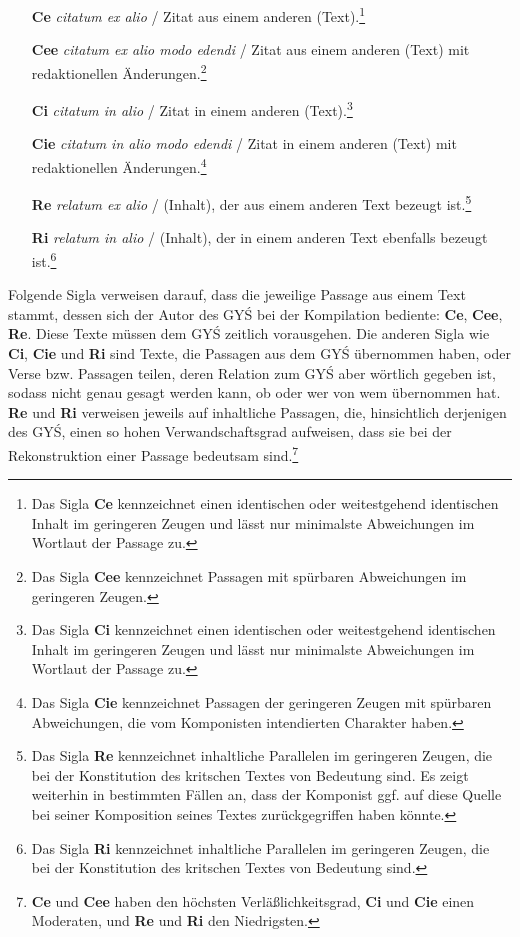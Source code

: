 \documentclass[a4paper,12pt]{article}
\begin{document}
\begin{enumerate}
\item[\textbf{Ce}] \textit{citatum ex alio} / Zitat aus einem anderen (Text).\footnote{Das Sigla \textbf{Ce} kennzeichnet einen identischen oder weitestgehend identischen Inhalt im geringeren Zeugen und lässt nur minimalste Abweichungen im Wortlaut der Passage zu.}
\item[\textbf{Cee}] \textit{citatum ex alio modo edendi} / Zitat aus einem anderen (Text) mit redaktionellen Änderungen.\footnote{Das Sigla \textbf{Cee} kennzeichnet Passagen mit spürbaren Abweichungen im geringeren Zeugen.}
\item[\textbf{Ci}] \textit{citatum in alio} / Zitat in einem anderen (Text).\footnote{Das Sigla \textbf{Ci} kennzeichnet einen identischen oder weitestgehend identischen Inhalt im geringeren Zeugen und lässt nur minimalste Abweichungen im Wortlaut der Passage zu.}
\item[\textbf{Cie}] \textit{citatum in alio modo edendi} / Zitat in einem anderen (Text) mit redaktionellen Änderungen.\footnote{Das Sigla \textbf{Cie} kennzeichnet Passagen der geringeren Zeugen mit spürbaren Abweichungen, die vom Komponisten intendierten Charakter haben.} 
\item[\textbf{Re}] \textit{relatum ex alio} / (Inhalt), der aus einem anderen Text bezeugt ist.\footnote{Das Sigla \textbf{Re} kennzeichnet inhaltliche Parallelen im geringeren Zeugen, die bei der Konstitution des kritschen Textes von Bedeutung sind. Es zeigt weiterhin in bestimmten Fällen an, dass der Komponist ggf. auf diese Quelle bei seiner Komposition seines Textes zurückgegriffen haben könnte.}
\item[\textbf{Ri}] \textit{relatum in alio} / (Inhalt), der in einem anderen Text ebenfalls bezeugt ist.\footnote{Das Sigla \textbf{Ri} kennzeichnet inhaltliche Parallelen im geringeren Zeugen, die bei der Konstitution des kritschen Textes von Bedeutung sind.} 
\end{enumerate}

Folgende Sigla verweisen darauf, dass die jeweilige Passage aus einem Text stammt, dessen sich der Autor des GYŚ bei der Kompilation bediente: \textbf{Ce}, \textbf{Cee}, \textbf{Re}. Diese Texte müssen dem GYŚ zeitlich vorausgehen. Die anderen Sigla wie \textbf{Ci}, \textbf{Cie} und \textbf{Ri} sind Texte, die Passagen aus dem GYŚ übernommen haben, oder Verse bzw. Passagen teilen, deren Relation zum GYŚ aber wörtlich gegeben ist, sodass nicht genau gesagt werden kann, ob oder wer von wem übernommen hat. \textbf{Re} und \textbf{Ri} verweisen jeweils auf inhaltliche Passagen, die, hinsichtlich derjenigen des GYŚ, einen so hohen Verwandschaftsgrad aufweisen, dass sie bei der Rekonstruktion einer Passage bedeutsam sind.\footnote{\textbf{Ce} und \textbf{Cee} haben den höchsten Verläßlichkeitsgrad, \textbf{Ci} und \textbf{Cie} einen Moderaten, und \textbf{Re} und \textbf{Ri} den Niedrigsten.}
\end{document}
